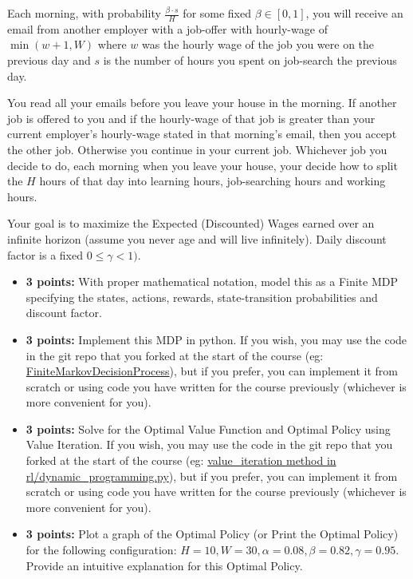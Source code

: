 \documentclass[12pt]{exam}
\begin{document}
\begin{questions}
Each morning, with probability $\frac {\beta \cdot s} H$ for some fixed $\beta \in [0, 1]$, you will receive an email from another employer with a job-offer with hourly-wage of $\min(w + 1, W)$ where $w$ was the hourly wage of the job you were on the previous day and $s$ is the number of hours you spent on job-search the previous day.

You read all your emails before you leave your house in the morning. If another job is offered to you and if the hourly-wage of that job is greater than your current employer's hourly-wage stated in that morning's email, then you accept the other job. Otherwise you continue in your current job. Whichever job you decide to do, each morning when you leave your house, your decide how to split the $H$ hours of that day into learning hours, job-searching hours and working hours. 

Your goal is to maximize the Expected (Discounted) Wages earned over an infinite horizon (assume you never age and will live infinitely). Daily discount factor is a fixed $0 \leq \gamma < 1)$.

\begin{itemize}
\item {\bf 3 points:} With proper mathematical notation, model this as a Finite MDP specifying the states, actions, rewards, state-transition probabilities and discount factor.
\item {\bf 3 points:} Implement this MDP in python. If you wish, you may use the code in the git repo that you forked at the start of the course (eg: \href{https://github.com/TikhonJelvis/RL-book/blob/master/rl/markov\_decision\_process.py#L232}{FiniteMarkovDecisionProcess}), but if you prefer, you can implement it from scratch or using code you have written for the course previously (whichever is more convenient for you).
\item {\bf 3 points:} Solve for the Optimal Value Function and Optimal Policy using Value Iteration. If you wish, you may use the code in the git repo that you forked at the start of the course (eg: \href{https://github.com/TikhonJelvis/RL-book/blob/master/rl/dynamic\_programming.py}{value\_iteration method in rl\//dynamic\_programming.py}), but if you prefer, you can implement it from scratch or using code you have written for the course previously (whichever is more convenient for you).
\item {\bf 3 points:} Plot a graph of the Optimal Policy (or Print the Optimal Policy) for the following configuration: $H = 10, W = 30, \alpha = 0.08, \beta = 0.82, \gamma = 0.95$. Provide an intuitive explanation for this Optimal Policy.
\end{itemize}


\end{questions}
\end{document}
